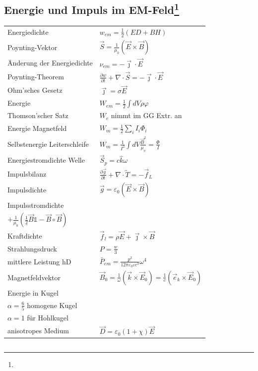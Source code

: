 \documentclass[12pt,a4paper]{article}
\newcommand{\pd}[2]{\frac{\partial #1}{\partial #2}}
\renewcommand{\=}[1]{\stackrel{#1}{=}}
\newcommand{\js}{\vec \jmath}
\theoremstyle{definition}
\theoremstyle{remark}
\begin{document}
\subsection[Energie und Impuls im EM-Feld]{Energie und Impuls im EM-Feld\let\thefootnote\relax\footnote{}}

\begin{center}
\begin{minipage}[t]{.5\linewidth}
\vspace{0pt}
\noindent\begin{tabular}{ll}
Energiedichte & $w_{em} = \frac{1}{2}(E D + B H)$\\
Poynting-Vektor & $\vec S = \frac{1}{\mu_0} (\vec E \times \vec B)$\\
Änderung der Energiedichte & $\nu_{em} = - \js \cdot \vec E$\\
Poynting-Theorem & $\pd{w}{t} + \nabla \cdot \vec S = - \js \cdot \vec E$\\
Ohm'sches Gesetz & $\js = \sigma \vec E$\\
Energie & $W_{em} = \frac{1}{2} \int dV \rho \varphi$\\
Thomson'scher Satz & $W_c$ nimmt im GG Extr. an\\
Energie Magnetfeld & $W_m = \frac{1}{2} \sum_i I_i \Phi_i$\\
Selbstenergie Leiterschleife & $W_m = \frac{1}{I^2} \int dV \frac{\vec B^2}{\mu_o} = \frac{\Phi}{I}$\\
Energiestromdichte Welle & $\vec S_p = c \hat k \omega$\\
Impulsbilanz & $\pd{\vec g}{t} + \nabla \cdot \overleftrightarrow T = - \vec f_L$\\
Impulsdichte & $\vec g = \varepsilon_0 (\vec E \times \vec B)$\\
Impulsstromdichte & \makecell[l]{$\overleftrightarrow T = \varepsilon_0 (\frac{1}{2} \vec E \mathbb{1} - \vec E \circ \vec B)$\\$ + \frac{1}{\mu_0} (\frac{1}{2} \vec B \mathbb{1} - \vec B \circ \vec B)$}\\
Kraftdichte &  $\vec f_l = \rho \vec E + \js \times \vec B$\\
Strahlungsdruck & $P = \frac{w}{3}$\\
mittlere Leistung hD & $\bar{P}_{em} = \frac{p^2}{12\pi \varepsilon_0 \varepsilon c^3} \omega^4$\\
Magnetfeldvektor & $\vec{B}_0 = \frac{1}{\omega} (\vec{k} \times \vec{E}_0) = \frac{1}{c} (\vec{e}_k \times \vec{E}_0)$\\
Energie in Kugel & \makecell[l]{$W_c = \alpha \frac{Q^2}{8\pi \varepsilon_0 a}$\\ $\alpha = \frac{6}{5}$ homogene Kugel\\ $\alpha = 1$ für Hohlkugel}\\
anisotropes Medium & $\vec D = \varepsilon_0 (1+\chi) \vec E$\\
\end{tabular}
\end{minipage}%
\begin{minipage}[t]{.5\linewidth}
\vspace{0pt}
\begin{tabular}{ll}
\end{tabular}


\end{minipage}
\end{center}
\end{document}
